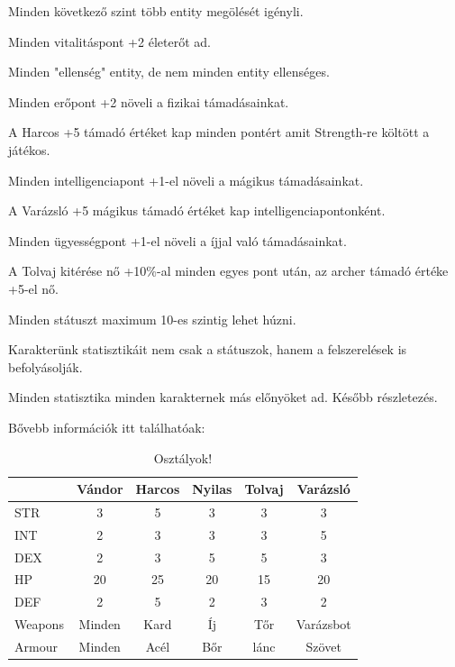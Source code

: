 \noindent Minden következő szint több entity megölését igényli.

\noindent Minden vitalitáspont +2 életerőt ad.

\noindent Minden "ellenség" entity, de nem minden entity ellenséges.


\noindent Minden erőpont +2 növeli a fizikai támadásainkat.

\noindent A Harcos +5 támadó értéket kap minden pontért amit Strength-re költött a játékos.

\noindent Minden intelligenciapont +1-el növeli a mágikus támadásainkat.

\noindent A Varázsló +5 mágikus támadó értéket kap intelligenciapontonként.

\noindent Minden ügyességpont +1-el növeli a íjjal való támadásainkat.

\noindent A Tolvaj kitérése nő +10\%-al minden egyes pont után, az archer támadó értéke +5-el nő.

\noindent Minden státuszt maximum 10-es szintig lehet húzni.


Karakterünk statisztikáit nem csak a státuszok, hanem a felszerelések is befolyásolják.

Minden statisztika minden karakternek más előnyöket ad. Később részletezés. 

Bővebb információk itt találhatóak:%
\begin{table}[h]
\centering
\caption{Osztályok!}
\label{tab:minta}
\begin{tabular}{|l|c|c|c|c|c|}
\hline
 & Vándor & Harcos & Nyilas & Tolvaj & Varázsló \\
\hline
STR & 3 & 5 & 3 & 3 & 3 \\
\hline
INT & 2 & 3 & 3 & 3 & 5 \\
\hline
DEX & 2 & 3 & 5 & 5 & 3 \\
\hline
HP & 20 & 25 & 20 & 15 & 20 \\
\hline
DEF & 2 & 5 & 2 & 3 & 2 \\
\hline
Weapons & Minden & Kard & Íj & Tőr & Varázsbot \\
\hline
Armour & Minden & Acél & Bőr & lánc & Szövet \\
\hline
\end{tabular}
\end{table}

